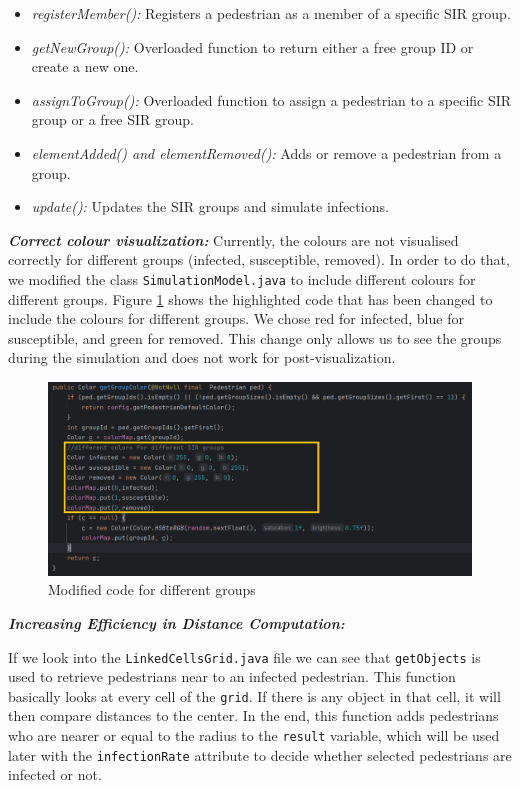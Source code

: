 \begin{itemize}
\begin{itemize}
    \item \textit{registerMember():} Registers a pedestrian as a member of a specific SIR group.
    \item \textit{getNewGroup():} Overloaded function to return either a free group ID or create a new one.
    \item \textit{assignToGroup():} Overloaded function to assign a pedestrian to a specific SIR group or a free SIR group.
    \item \textit{elementAdded() and elementRemoved():} Adds or remove a pedestrian from a group.
    \item \textit{update():} Updates the SIR groups and simulate infections.
    
\end{itemize}
\end{itemize}

\textit{\textbf{Correct colour visualization:}} Currently, the colours are not visualised correctly for different groups (infected, susceptible, removed). In order to do that, we modified the class \texttt{SimulationModel.java} to include different colours for different groups. Figure \ref{fig:SIRGroupColoring} shows the highlighted code that has been changed to include the colours for different groups. We chose red for infected, blue for susceptible, and green for removed. This change only allows us to see the groups during the simulation and does not work for post-visualization.
\begin{figure}[H]
    \centering
    \includegraphics[width=\linewidth]{images/SIRGroupColoring.png}
    \caption{Modified code for different groups}
    \label{fig:SIRGroupColoring}
\end{figure}





\textit{\textbf{Increasing Efficiency in  Distance Computation:}}

If we look into the \texttt{LinkedCellsGrid.java} file we can see that \texttt{getObjects} is used to retrieve pedestrians near to an infected pedestrian. This function basically looks at every cell of the \texttt{grid}. If there is any object in that cell, it will then compare distances to the center. In the end, this function adds pedestrians who are nearer or equal to the radius to the \texttt{result} variable, which will be used later with the \texttt{infectionRate} attribute to decide whether selected pedestrians are infected or not.

